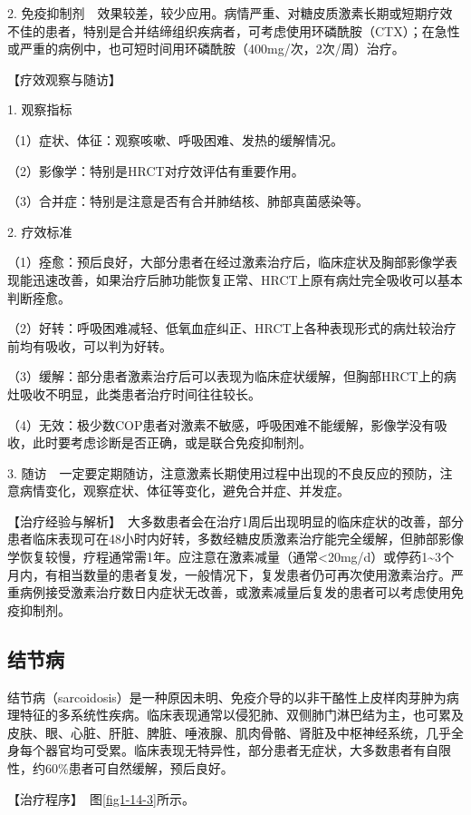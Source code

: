 2.
免疫抑制剂　效果较差，较少应用。病情严重、对糖皮质激素长期或短期疗效不佳的患者，特别是合并结缔组织疾病者，可考虑使用环磷酰胺（CTX）；在急性或严重的病例中，也可短时间用环磷酰胺（400mg/次，2次/周）治疗。

【疗效观察与随访】

1. 观察指标

（1）症状、体征：观察咳嗽、呼吸困难、发热的缓解情况。

（2）影像学：特别是HRCT对疗效评估有重要作用。

（3）合并症：特别是注意是否有合并肺结核、肺部真菌感染等。

2. 疗效标准

（1）痊愈：预后良好，大部分患者在经过激素治疗后，临床症状及胸部影像学表现能迅速改善，如果治疗后肺功能恢复正常、HRCT上原有病灶完全吸收可以基本判断痊愈。

（2）好转：呼吸困难减轻、低氧血症纠正、HRCT上各种表现形式的病灶较治疗前均有吸收，可以判为好转。

（3）缓解：部分患者激素治疗后可以表现为临床症状缓解，但胸部HRCT上的病灶吸收不明显，此类患者治疗时间往往较长。

（4）无效：极少数COP患者对激素不敏感，呼吸困难不能缓解，影像学没有吸收，此时要考虑诊断是否正确，或是联合免疫抑制剂。

3.
随访　一定要定期随访，注意激素长期使用过程中出现的不良反应的预防，注意病情变化，观察症状、体征等变化，避免合并症、并发症。

【治疗经验与解析】　大多数患者会在治疗1周后出现明显的临床症状的改善，部分患者临床表现可在48小时内好转，多数经糖皮质激素治疗能完全缓解，但肺部影像学恢复较慢，疗程通常需1年。应注意在激素减量（通常\textless{}20mg/d）或停药1\textasciitilde{}3个月内，有相当数量的患者复发，一般情况下，复发患者仍可再次使用激素治疗。严重病例接受激素治疗数日内症状无改善，或激素减量后复发的患者可以考虑使用免疫抑制剂。

\subsection{结节病}

结节病（sarcoidosis）是一种原因未明、免疫介导的以非干酪性上皮样肉芽肿为病理特征的多系统性疾病。临床表现通常以侵犯肺、双侧肺门淋巴结为主，也可累及皮肤、眼、心脏、肝脏、脾脏、唾液腺、肌肉骨骼、肾脏及中枢神经系统，几乎全身每个器官均可受累。临床表现无特异性，部分患者无症状，大多数患者有自限性，约60\%患者可自然缓解，预后良好。

【治疗程序】　图\ref{fig1-14-3}所示。

